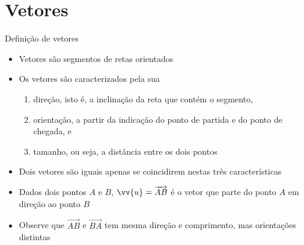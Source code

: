 \section{Vetores}

\begin{frame}[fragile]{Definição de vetores}

    \begin{itemize}
        \item Vetores são segmentos de retas orientados
        \pause

        \item Os vetores são caracterizados pela sua 

        \begin{enumerate}
            \item direção, isto é, a inclinação da reta que contém o segmento,
            \pause

            \item orientação, a partir da indicação do ponto de partida e do ponto de chegada, e
            \pause
        
            \item tamanho, ou seja, a distância entre os dois pontos
        \end{enumerate}
        \pause

        \item Dois vetores são iguais apenas se coincidirem nestas três características
        \pause

        \item Dados dois pontos $A$ e $B$, $\vv{u} = \overrightarrow{AB}$ é o vetor que parte do ponto $A$ em direção 
        ao ponto $B$ 
        \pause

        \item Observe que $\overrightarrow{AB}$ e $\overrightarrow{BA}$ tem mesma direção e comprimento, mas orientações distintas
    \end{itemize}

\end{frame}


